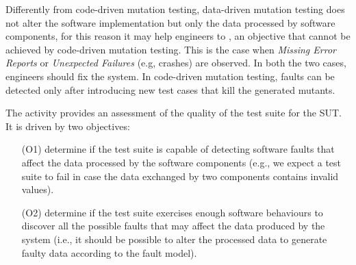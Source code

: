 Differently from code-driven mutation testing, data-driven mutation testing does not alter the software implementation but only the data processed by software components, for this reason it may help engineers to , an objective that cannot be achieved by code-driven mutation testing. 
This is the case when \emph{Missing Error Reports} or \emph{Unexpected Failures }(e.g, crashes) are observed. In both the two cases, engineers should fix the system. In code-driven mutation testing, faults can be detected only after introducing new test cases that kill the generated mutants.

The activity  provides an assessment of the quality of the test suite for the SUT.
It is driven by two objectives:
\begin{itemize}
\item[(O1)] determine if the test suite is capable of detecting software faults that affect the data processed by the software components 
(e.g., we expect a test suite to fail in case the data exchanged by two components contains invalid values).
\item[(O2)] determine if the test suite exercises enough software behaviours to discover all the possible faults that may affect the data produced by the system
(i.e., it should be possible to alter the processed data to generate faulty data according to the fault model). 
\end{itemize}

